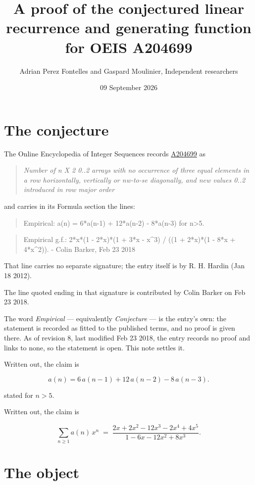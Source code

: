 \documentclass[11pt]{article}
\title{A proof of the conjectured linear recurrence and generating function for OEIS A204699}
\author{Adrian Perez Fontelles and Gaspard Moulinier, Independent researchers}
\date{09 September 2026}
\theoremstyle{definition}
\begin{document}
\maketitle
\section{The conjecture}

The Online Encyclopedia of Integer Sequences records \href{https://oeis.org/A204699}{A204699} as

\begin{quote}\itshape Number of n X 2 0..2 arrays with no occurrence of three equal elements in a row horizontally, vertically or nw-to-se diagonally, and new values 0..2 introduced in row major order\end{quote}

and carries in its Formula section the lines:

\begin{quote}\ttfamily Empirical: a(n) = 6*a(n-1) + 12*a(n-2) - 8*a(n-3) for n>5.\end{quote}

\begin{quote}\ttfamily Empirical g.f.: 2*x*(1 - 2*x)*(1 + 3*x - x\textasciicircum{}3) / ((1 + 2*x)*(1 - 8*x + 4*x\textasciicircum{}2)). - Colin Barker, Feb 23 2018\end{quote}

That line carries no separate signature; the entry itself is by R. H. Hardin (Jan 18 2012).

The line quoted ending in that signature is contributed by Colin Barker on Feb 23 2018.

The word {\itshape Empirical} --- equivalently {\itshape Conjecture} --- is the entry's own: the statement is recorded as fitted to the published terms, and no proof is given there. As of revision 8, last modified Feb 23 2018, the entry records no proof and links to none, so the statement is open. This note settles it.

Written out, the claim is

\[a(n) = 6\,a(n-1) + 12\,a(n-2) - 8\,a(n-3).\]

stated for $n > 5$.

Written out, the claim is

\[\sum_{n \ge 1} a(n)\,x^n \;=\; \frac{2x + 2x^{2} - 12x^{3} - 2x^{4} + 4x^{5}}{1 - 6x - 12x^{2} + 8x^{3}}.\]

\section{The object}
\end{document}
